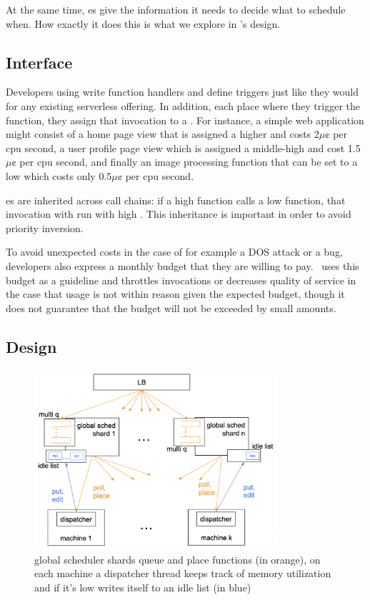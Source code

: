 At the same time, \class{}es give \sys{} the information it needs to decide what
to schedule when. How exactly it does this is what we explore in \sys{}'s
design.



\subsection{Interface}


Developers using \sys{} write function handlers and define triggers just like
they would for any existing serverless offering. In addition, each place where
they trigger the function, they assign that invocation to a \priceclass{}. For
instance, a simple web application might consist of a home page view that is
assigned a higher \priceclass{} and costs 2$\mu\cent$ per cpu second, a user
profile page view which is assigned a middle-high \class{} and cost
1.5$\mu\cent$ per cpu second, and finally an image processing function that can
be set to a low \class{} which costs only 0.5$\mu\cent$ per cpu second.

\Class{}es are inherited across call chains: if a high \class{} function calls a
low \class{} function, that invocation with run with high \class{}. This
inheritance is important in order to avoid priority inversion.

To avoid unexpected costs in the case of for example a DOS attack or a bug,
developers also express a monthly budget that they are willing to pay.\ \sys{}
uses this budget as a guideline and throttles invocations or decreases quality
of service in the case that usage is not within reason given the expected
budget, though it does not guarantee that the budget will not be exceeded by
small amounts.



\subsection{\Sys{} Design}

\begin{figure}[t]
    \centering
      \includegraphics[width=9cm]{img/overview.png}
      \caption{ global scheduler shards queue and place functions (in orange), 
      on each machine a dispatcher thread keeps track of memory utilization 
      and if it's low writes itself to an idle list (in blue) }
    \label{fig:overview}
\end{figure}



